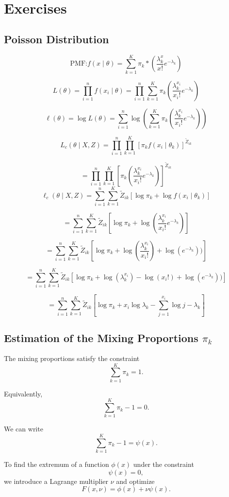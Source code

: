 \section{Exercises}

\subsection{Poisson Distribution}

\[
\text{PMF:} f(x \mid \theta)= \sum_{k=1}^K \pi_k * (\frac{\lambda_k^x}{x!} e^{-\lambda_k})
\]

\[
L(\theta) = \prod_{i=1}^n f(x_i \mid \theta) = \prod_{i=1}^{n} \sum_{k=1}^K \pi_k (\frac{\lambda_k^{x_i}}{x_i!} e^{-\lambda_k})
\]

\[
\ell(\theta) = \log L(\theta) = \sum_{i=1}^{n} \log(\sum_{k=1}^K \pi_k (\frac{\lambda_k^{x_i}}{x_i!} e^{-\lambda_k}))
\]

\[
L_c(\theta \mid X, Z) = \prod_{i=1}^n \prod_{k=1}^K [\pi_k f(x_i \mid \theta_k)]^{\tilde{Z}_{ik}}
\]

\[
= \prod_{i=1}^n \prod_{k=1}^K [\pi_k (\frac{\lambda_k^{x_i}}{x_i!} e^{-\lambda_k})]^{\tilde{Z}_{ik}}
\]
\[
\ell_c(\theta \mid X, Z) = \sum_{i=1}^n \sum_{k=1}^K \tilde{Z}_{ik} [\log \pi_k + \log f(x_i \mid \theta_k)]
\]

\[
= \sum_{i=1}^n \sum_{k=1}^K \tilde{Z}_{ik} [\log \pi_k + \log (\frac{\lambda_k^{x_i}}{x_i!} e^{-\lambda_k})]
\]

\[
= \sum_{i=1}^n \sum_{k=1}^K \tilde{Z}_{ik} [\log \pi_k + \log (\frac{\lambda_k^{x_i}}{x_i!}) + \log (e^{-\lambda_k}))]
\]

\[
= \sum_{i=1}^n \sum_{k=1}^K \tilde{Z}_{ik} [\log \pi_k + \log (\lambda_k^{x_i}) - \log (x_i!) + \log (e^{-\lambda_k}))]
\]

\[
= \sum_{i=1}^n \sum_{k=1}^K \tilde{Z}_{ik} [\log \pi_k + x_i\log \lambda_k - \sum_{j=1}^{x_i} \log j - \lambda_k]
\]

\subsection{Estimation of the Mixing Proportions $\pi_k$}

The mixing proportions satisfy the constraint
\[
\sum_{k=1}^K\pi_k=1.
\]

Equivalently,
\[
\sum_{k=1}^K\pi_k-1=0.
\]

We can write
\[
\sum_{k=1}^K\pi_k-1=\psi(x).
\]

To find the extremum of a function $\phi(x)$ under the constraint
\[
\psi(x)=0,
\]
we introduce a Lagrange multiplier $\nu$ and optimize
\[
F(x,\nu) = \phi(x)+\nu\psi(x).
\]

